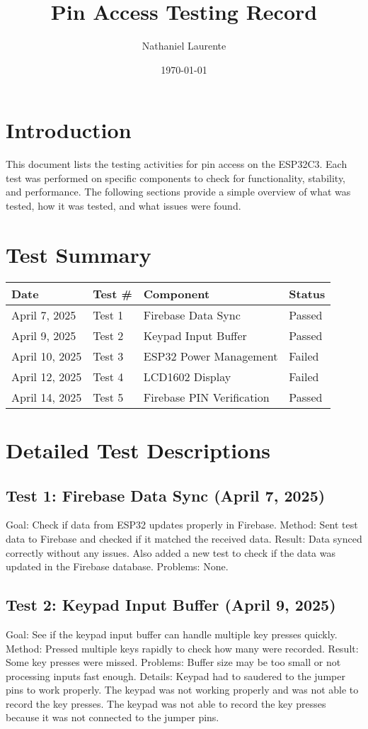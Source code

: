 \documentclass{article}
\title{Pin Access Testing Record}
\author{Nathaniel Laurente}
\date{\today}
\begin{document}
\maketitle

\section*{Introduction}
This document lists the testing activities for pin access on the ESP32C3. Each test was performed on specific components to check for functionality, stability, and performance. The following sections provide a simple overview of what was tested, how it was tested, and what issues were found.

\section*{Test Summary}
\begin{tabular}{| l | l | l | l |}
\hline
\textbf{Date} & \textbf{Test \#} & \textbf{Component} & \textbf{Status} \\
\hline
April 7, 2025 & Test 1 & Firebase Data Sync & Passed \\
April 9, 2025 & Test 2 & Keypad Input Buffer & Passed \\
April 10, 2025 & Test 3 & ESP32 Power Management & Failed \\
April 12, 2025 & Test 4 & LCD1602 Display & Failed \\
April 14, 2025 & Test 5 & Firebase PIN Verification & Passed \\



\hline
\end{tabular}

\section*{Detailed Test Descriptions}

\subsection*{Test 1: Firebase Data Sync (April 7, 2025)}
Goal: Check if data from ESP32 updates properly in Firebase.
Method: Sent test data to Firebase and checked if it matched the received data.
Result: Data synced correctly without any issues. Also added a new test to check if the data was updated in the Firebase database.
Problems: None.

\subsection*{Test 2: Keypad Input Buffer (April 9, 2025)}
Goal: See if the keypad input buffer can handle multiple key presses quickly.
Method: Pressed multiple keys rapidly to check how many were recorded.
Result: Some key presses were missed.
Problems: Buffer size may be too small or not processing inputs fast enough.
Details: Keypad had to saudered to the jumper pins to work properly. The keypad was not working properly and was not able to record the key presses. The keypad was not able to record the key presses because it was not connected to the jumper pins. 
\end{document}
